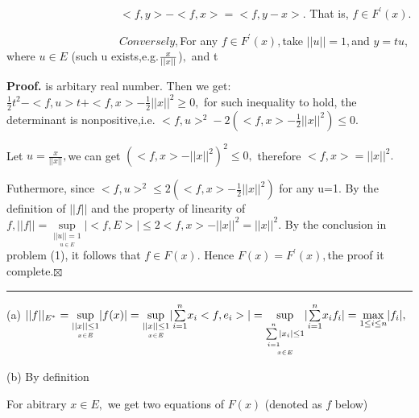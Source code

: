 \documentclass{article}
\newenvironment{proof}[1][Proof]{\noindent\textbf{#1.} }{\ \rule{0.5em}{0.5em}}
\begin{document}
$\qquad \qquad \qquad \qquad \qquad <f,y>-<f,x>=<f,y-x>.$ That is, $f\in
F^{\prime }(x).$

$\qquad \qquad \qquad \qquad \qquad Conversely,$For any $f\in F^{\prime
}(x), $take $||u||=1,$and $y=tu,$where $u\in E$ (such u exists,e.g.$\frac{x}{%
||x||} $)$,$ and t

\begin{proof}
is arbitary real number. Then we get: $\frac{1}{2}t^{2}-<f,u>t+<f,x>-\frac{1%
}{2}||x||^{2}\geq 0,$ for such inequality to hold, the determinant is
nonpositive,i.e. $<f,u>^{2}-2(<f,x>-\frac{1}{2}||x||^{2})\leq 0.$

Let $u=\frac{x}{||x||},$we can get $(<f,x>-||x||^{2})^{2}\leq 0,$ therefore $%
<f,x>=||x||^{2}.$

Futhermore, since $<f,u>^{2}\leq 2(<f,x>-\frac{1}{2}||x||^{2})$ for any 
\TEXTsymbol{\vert}\TEXTsymbol{\vert}u\TEXTsymbol{\vert}\TEXTsymbol{\vert}=1.
By the definition of $||f||$ and the property of linearity of $f,||f||=%
\underset{\underset{u\in E}{||u||=1}}{\sup }|<f,E>|\leq
2<f,x>-||x||^{2}=||x||^{2}.$ By the conclusion in problem (1), it follows
that $f\in F(x).$ Hence $F(x)=F^{\prime }(x),$the proof it complete.$%
\boxtimes $
\end{proof}


(a) $||f||_{E^{\ast }}=\underset{\underset{x\in E}{||x||\leq 1}}{\sup }%
|f(x)|=\underset{\underset{x\in E}{||x||\leq 1}}{\sup }|\underset{i=1}{%
\overset{n}{\sum }}x_{i}<f,e_{i}>|=\underset{\underset{x\in E}{\underset{i=1}%
{\overset{n}{\sum |}}x_{i}|\leq 1}}{\sup }|\underset{i=1}{\overset{n}{\sum }}%
x_{i}f_{i}|=\underset{1\leq i\leq n}{\max }|f_{i}|,$

(b) By definition 

For abitrary $x\in E,$ we get two equations of $F(x)$ (denoted as $f$ below)
\end{document}
